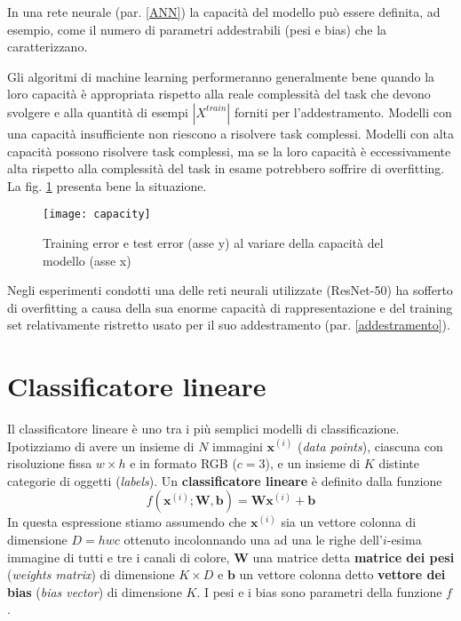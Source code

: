 In una rete neurale (par. \ref{ANN}) la capacità del modello può essere definita, ad esempio, come il numero di parametri addestrabili (pesi e bias) che la caratterizzano.

Gli algoritmi di machine learning performeranno generalmente bene quando la loro capacità è appropriata rispetto alla reale complessità del task che devono svolgere e alla quantità di esempi $|X^{train}|$ forniti per l'addestramento. Modelli con una capacità insufficiente non riescono a risolvere task complessi. Modelli con alta capacità possono risolvere task complessi, ma se la loro capacità è eccessivamente alta rispetto alla complessità del task in esame potrebbero soffrire di overfitting. La fig. \ref{fig:capacity} presenta bene la situazione.

\begin{figure}[h]
\centering
\texttt{[image: capacity]}
\caption{Training error e test error (asse y) al variare della capacità del modello (asse x)}
\label{fig:capacity}
\end{figure}

Negli esperimenti condotti una delle reti neurali utilizzate (ResNet-50) ha sofferto di overfitting a causa della sua enorme capacità di rappresentazione e del training set relativamente ristretto usato per il suo addestramento (par. \ref{addestramento}).

\section{Classificatore lineare}
\label{classificatoreLineare}
Il classificatore lineare è uno tra i più semplici modelli di classificazione.
Ipotizziamo di avere un insieme di $N$ immagini $\mathbf{x}^{(i)}$ (\textit{data points}), ciascuna con risoluzione fissa $w\times h$ e in formato RGB ($c=3$), e un insieme di $K$ distinte categorie di oggetti  (\textit{labels}). Un \textbf{classificatore lineare} è definito dalla funzione
\begin{equation} \label{eq_class_lin}
f(\mathbf{x}^{(i)};\mathbf{W},\mathbf{b})=\mathbf{W}\mathbf{x}^{(i)}+\mathbf{b}
\end{equation}
In questa espressione stiamo assumendo che $\mathbf{x}^{(i)}$ sia un vettore colonna di dimensione $D=hwc$ ottenuto incolonnando una ad una le righe dell'$i$-esima immagine di tutti e tre i canali di colore, $\mathbf{W}$ una matrice detta \textbf{matrice dei pesi} (\textit{weights matrix}) di dimensione $K\times D$ e $\mathbf{b}$ un vettore colonna detto \textbf{vettore dei bias} (\textit{bias vector}) di dimensione $K$. I pesi e i bias sono parametri della funzione $f$.

